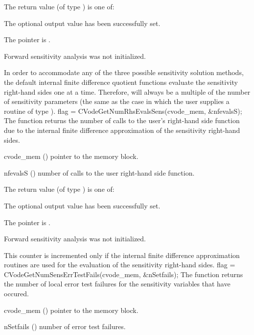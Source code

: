 {
  The return value  (of type ) is one of:
  \begin{args}
  \item[\Id{CV\_SUCCESS}] 
    The optional output value has been successfully set.
  \item[\Id{CV\_MEM\_NULL}]
    The  pointer is .
  \item[\Id{CV\_NO\_SENS}]
    Forward sensitivity analysis was not initialized.
  \end{args}
}
{
  In order to accommodate any of the three possible sensitivity solution methods,
  the default internal 
  finite difference quotient functions evaluate the sensitivity right-hand sides 
  one at a time. Therefore,  will always be a multiple of the
  number of sensitivity parameters (the same as the case in which the user supplies
  a routine of type ).
}
{
  flag = CVodeGetNumRhsEvalsSens(cvode\_mem, \&nfevalsS);
}
{
  The function  returns the number of calls to the
  user's right-hand side function due to the internal finite difference approximation
  of the sensitivity right-hand sides.
}
{
  \begin{args}
  \item[cvode\_mem] ()
    pointer to the {\cvodes} memory block.
  \item[nfevalsS] ()
    number of calls to the user right-hand side function.
  \end{args}
}
{
  The return value  (of type ) is one of:
  \begin{args}
  \item[\Id{CV\_SUCCESS}] 
    The optional output value has been successfully set.
  \item[\Id{CV\_MEM\_NULL}]
    The  pointer is .
  \item[\Id{CV\_NO\_SENS}]
    Forward sensitivity analysis was not initialized.
  \end{args}
}
{
  This counter is incremented only if the internal finite difference approximation
  routines are used for the evaluation of the sensitivity right-hand sides.
}
{
  flag = CVodeGetNumSensErrTestFails(cvode\_mem, \&nSetfails);
}
{
  The function  returns the number of local
  error test failures for the sensitivity variables that have occured.
}
{
  \begin{args}
  \item[cvode\_mem] ()
    pointer to the {\cvodes} memory block.
  \item[nSetfails] ()
    number of error test failures.
  \end{args}
}

